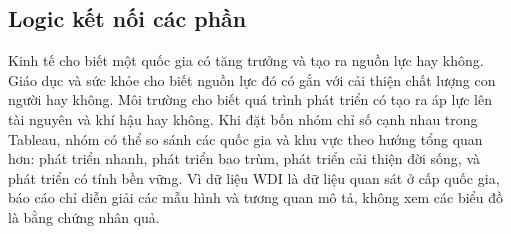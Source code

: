 \subsection{Logic kết nối các phần}

Kinh tế cho biết một quốc gia có tăng trưởng và tạo ra nguồn lực hay không. Giáo dục và sức khỏe cho biết nguồn lực đó có gắn với cải thiện chất lượng con người hay không. Môi trường cho biết quá trình phát triển có tạo ra áp lực lên tài nguyên và khí hậu hay không. Khi đặt bốn nhóm chỉ số cạnh nhau trong Tableau, nhóm có thể so sánh các quốc gia và khu vực theo hướng tổng quan hơn: phát triển nhanh, phát triển bao trùm, phát triển cải thiện đời sống, và phát triển có tính bền vững. Vì dữ liệu WDI là dữ liệu quan sát ở cấp quốc gia, báo cáo chỉ diễn giải các mẫu hình và tương quan mô tả, không xem các biểu đồ là bằng chứng nhân quả.
